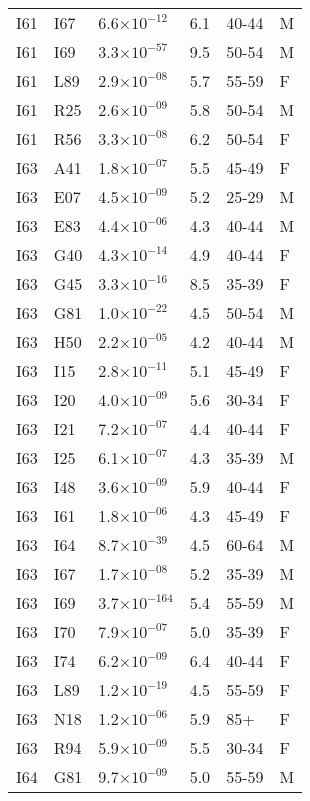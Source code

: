 \begin{longtable}{lllrll}
   I61 & I67 & 6.6$\times10^{-12}$ & 6.1 & 40-44 & M \\ 
   I61 & I69 & 3.3$\times10^{-57}$ & 9.5 & 50-54 & M \\ 
   I61 & L89 & 2.9$\times10^{-08}$ & 5.7 & 55-59 & F \\ 
   I61 & R25 & 2.6$\times10^{-09}$ & 5.8 & 50-54 & M \\ 
   I61 & R56 & 3.3$\times10^{-08}$ & 6.2 & 50-54 & F \\ 
   I63 & A41 & 1.8$\times10^{-07}$ & 5.5 & 45-49 & F \\ 
   I63 & E07 & 4.5$\times10^{-09}$ & 5.2 & 25-29 & M \\ 
   I63 & E83 & 4.4$\times10^{-06}$ & 4.3 & 40-44 & M \\ 
   I63 & G40 & 4.3$\times10^{-14}$ & 4.9 & 40-44 & F \\ 
   I63 & G45 & 3.3$\times10^{-16}$ & 8.5 & 35-39 & F \\ 
   I63 & G81 & 1.0$\times10^{-22}$ & 4.5 & 50-54 & M \\ 
   I63 & H50 & 2.2$\times10^{-05}$ & 4.2 & 40-44 & M \\ 
   I63 & I15 & 2.8$\times10^{-11}$ & 5.1 & 45-49 & F \\ 
   I63 & I20 & 4.0$\times10^{-09}$ & 5.6 & 30-34 & F \\ 
   I63 & I21 & 7.2$\times10^{-07}$ & 4.4 & 40-44 & F \\ 
   I63 & I25 & 6.1$\times10^{-07}$ & 4.3 & 35-39 & M \\ 
   I63 & I48 & 3.6$\times10^{-09}$ & 5.9 & 40-44 & F \\ 
   I63 & I61 & 1.8$\times10^{-06}$ & 4.3 & 45-49 & F \\ 
   I63 & I64 & 8.7$\times10^{-39}$ & 4.5 & 60-64 & M \\ 
   I63 & I67 & 1.7$\times10^{-08}$ & 5.2 & 35-39 & M \\ 
   I63 & I69 & 3.7$\times10^{-164}$ & 5.4 & 55-59 & M \\ 
   I63 & I70 & 7.9$\times10^{-07}$ & 5.0 & 35-39 & F \\ 
   I63 & I74 & 6.2$\times10^{-09}$ & 6.4 & 40-44 & F \\ 
   I63 & L89 & 1.2$\times10^{-19}$ & 4.5 & 55-59 & F \\ 
   I63 & N18 & 1.2$\times10^{-06}$ & 5.9 & 85+ & F \\ 
   I63 & R94 & 5.9$\times10^{-09}$ & 5.5 & 30-34 & F \\ 
   I64 & G81 & 9.7$\times10^{-09}$ & 5.0 & 55-59 & M \\ 

\end{longtable}
